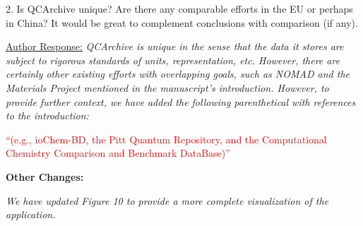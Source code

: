 \documentclass[12pt]{article}
\begin{document}
2.	Is QCArchive unique? Are there any comparable efforts in the EU or perhaps in China? It would be great to complement conclusions with comparison (if any).

\noindent
\underline{Author Response:} \textit{ QCArchive is unique in the sense that the
data it stores are subject to rigorous standards of units, representation, etc.
However, there are certainly other existing efforts with overlapping goals, such
as NOMAD and the Materials Project mentioned in the manuscript's introduction.
However, to provide further context, we have added the following parenthetical
with references
to the introduction:}

\noindent
\textcolor{red}{``(e.g., ioChem-BD, the Pitt Quantum Repository, and the
Computational Chemistry Comparison and Benchmark DataBase)''}

\noindent
\textbf{Other Changes:}

\noindent \textit{We have updated Figure 10 to provide a more complete visualization of the application.}
\end{document}
